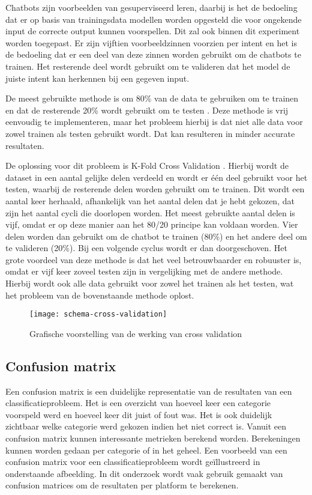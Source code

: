 Chatbots zijn voorbeelden van gesuperviseerd leren, daarbij is het de bedoeling dat er op basis van trainingsdata modellen worden opgesteld die voor ongekende input de correcte output kunnen voorspellen. Dit zal ook binnen dit experiment worden toegepast. Er zijn vijftien voorbeeldzinnen voorzien per intent en het is de bedoeling dat er een deel van deze zinnen worden gebruikt om de chatbots te trainen. Het resterende deel wordt gebruikt om te valideren dat het model de juiste intent kan herkennen bij een gegeven input.

De meest gebruikte methode is om 80\% van de data te gebruiken om te trainen en dat de resterende 20\% wordt gebruikt om te testen \autocite{Desmarais2018}. Deze methode is vrij eenvoudig te implementeren, maar het probleem hierbij is dat niet alle data voor zowel trainen als testen gebruikt wordt. Dat kan resulteren in minder accurate resultaten.

De oplossing voor dit probleem is K-Fold Cross Validation \autocite{Desmarais2018}. Hierbij wordt de dataset in een aantal gelijke delen verdeeld en wordt er één deel gebruikt voor het testen, waarbij de resterende delen worden gebruikt om te trainen. Dit wordt een aantal keer herhaald, afhankelijk van het aantal delen dat je hebt gekozen, dat zijn het aantal cycli die doorlopen worden. Het meest gebruikte aantal delen is vijf, omdat er op deze manier aan het 80/20 principe kan voldaan worden. Vier delen worden dan gebruikt om de chatbot te trainen (80\%) en het andere deel om te valideren (20\%). Bij een volgende cyclus wordt er dan doorgeschoven. Het grote voordeel van deze methode is dat het veel betrouwbaarder en robuuster is, omdat er vijf keer zoveel testen zijn in vergelijking met de andere methode. Hierbij wordt ook alle data gebruikt voor zowel het trainen als het testen, wat het probleem van de bovenstaande methode oplost.

\begin{figure}[H]
    \label{fig:cross-validation-schema}
    \centering
    \texttt{[image: schema-cross-validation]}
    \caption{Grafische voorstelling van de werking van cross validation}
\end{figure}

\subsection{Confusion matrix}
\label{subsec:validatie-confusion-matrix}

Een confusion matrix is een duidelijke representatie van de resultaten van een classificatieprobleem. Het is een overzicht van hoeveel keer een categorie voorspeld werd en hoeveel keer dit juist of fout was. Het is ook duidelijk zichtbaar welke categorie werd gekozen indien het niet correct is. Vanuit een confusion matrix kunnen  interessante metrieken berekend worden. Berekeningen kunnen worden gedaan per categorie of in het geheel. Een voorbeeld van een confusion matrix voor een classificatieprobleem wordt geïllustreerd in onderstaande afbeelding. In dit onderzoek wordt vaak gebruik gemaakt van confusion matrices om de resultaten per platform te berekenen.

